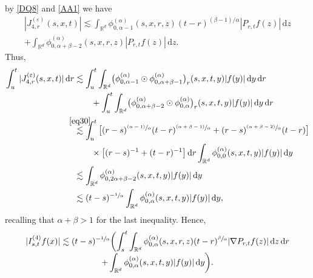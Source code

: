 \documentclass[11pt]{article}
\numberwithin{equation}{section}\providecommand{\asymp}{\mathrel{\sim}}
\newcommand{\psfrac}[2]{\sfrac{(#1)}{#2}}
\newcommand{\sm}[1]{\makebox[0pt][c]{\scriptsize#1}}
\theoremstyle{plain}
\theoremstyle{definition}
\let\eps\varepsilon
\newcommand\mR{\mathbb{R}}
\newcommand\1{{\mathbf{1}}}
\newcommand{\dif}{\,\mathrm{d}}
\begin{document}
by \eqref{DQ8} and \eqref{AA1} we have
\begin{multline*}
|J^{(\eps)}_{4,r}(s,x,t)|\lesssim\int_{\mR^d}\phi^{(\alpha)}_{0,\alpha-1}(s,x,r,z) (t-r)^{(\beta-1)/\alpha}|P_{r,t}f(z)|\dif z\\[-3pt]
+\int_{\mR^d}\phi^{(\alpha)}_{0,\alpha+\beta-2}(s,x,r,z)|P_{r,t}f(z)|\dif z.
\end{multline*}
Thus,\vspace*{-3pt}
\begin{align*}
\int^t_{u}|J^{(\eps)}_{4,r}(s,x,t)|\dif r&\lesssim\int^t_{u}\int_{\mR^d}\bigl(\phi^{(\alpha)}_{0,\alpha-1}
\odot\phi^{(\alpha)}_{0,\alpha+\beta-1}\bigr)_r(s,x,t,y)|f(y)|\dif y\dif r\\
&\qquad+\int^t_{u}\int_{\mR^d}\bigl(\phi^{(\alpha)}_{0,\alpha+\beta-2}
\odot\phi^{(\alpha)}_{0,\alpha}\bigr)_r(s,x,t,y)|f(y)|\dif y\dif r\\
&\stackrel{\sm{\eqref{eq30}}}{\lesssim}\int^t_u\big[(r-s)^{\psfrac{\alpha-1}{\alpha}}(t-r)^{\psfrac{\alpha+\beta-1}{\alpha}}+(r-s)^{\psfrac{\alpha+\beta-2}{\alpha}}(t-r)\big]\\
&\qquad\times\big[(r-s)^{-1}+(t-r)^{-1}\big]\dif r
\int_{\mR^d}\phi^{(\alpha)}_{0,0}(s,x,t,y)|f(y)|\dif y\\
&\lesssim\int_{\mR^d}\phi^{(\alpha)}_{0,2\alpha+\beta-2}(s,x,t,y)|f(y)|\dif y\\
&\lesssim (t-s)^{-\sfrac1\alpha}\int_{\mR^d}\phi^{(\alpha)}_{0,\alpha}(s,x,t,y)|f(y)|\dif y,
\end{align*}
recalling that $\alpha+\beta>1 $ for the last inequality.
Hence,\vspace*{-3pt}
\begin{multline*}
|I^{(4)}_{s,t} f(x)|
\lesssim(t-s)^{-\sfrac1\alpha}\biggl( \int^t_s\int_{\mR^d}\phi^{(\alpha)}_{0,\alpha}(s,x,r,z)(t-r)^{\sfrac{\beta}{\alpha}}|\nabla P_{r,t}f(z)|\dif z\dif r\\[-3pt]
+\int_{\mR^d}\phi^{(\alpha)}_{0,\alpha}(s,x,t,y)|f(y)|\dif y\biggr).
\end{multline*}
\end{document}
